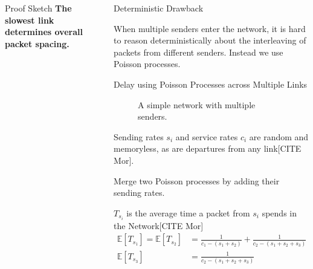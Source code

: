 \documentclass[final]{beamer}
\newlength{\sepwidth}
\newlength{\colwidth}
\newcommand{\separatorcolumn}{\begin{column}{\sepwidth}\end{column}}
\begin{document}
\begin{frame}[t]
\begin{columns}[t]
\begin{column}{\colwidth}
\begin{exampleblock}{Proof Sketch}
    {\Large\textbf{The slowest link determines overall packet spacing.}}
  \end{exampleblock}
  \vspace{-10mm}

  
\end{column}

\separatorcolumn

\begin{column}{\colwidth}

  \begin{block}{Deterministic Drawback}
   
    When multiple senders enter the network, it is hard to reason deterministically 
    about the interleaving of packets from different senders. 
    Instead we use Poisson processes.
    
  \end{block}

  \begin{block}{Delay using Poisson Processes across Multiple Links}
    \begin{figure}
      \centering
      \caption{A simple network with multiple senders.}
    \end{figure}

    Sending rates $s_i$ and service rates $c_i$ are random and memoryless, as are
    departures from any link[CITE Mor].

    Merge two Poisson processes by adding their sending rates.

    $T_{s_i}$ is the average time a packet from $s_i$ spends in the Network[CITE Mor]
    {\large\begin{align*}
      \mathbb{E}[T_{s_1}] = \mathbb{E}[T_{s_2}] &= \frac{1}{c_1 - (s_1+s_2)} + \frac{1}{c_2 - (s_1 + s_2+s_3)}\\
      \mathbb{E}[T_{s_3}] &= \frac{1}{c_2 - (s_1 + s_2+s_3)}
    \end{align*}}
  \end{block}


\end{column}
\end{columns}
\end{frame}
\end{document}
